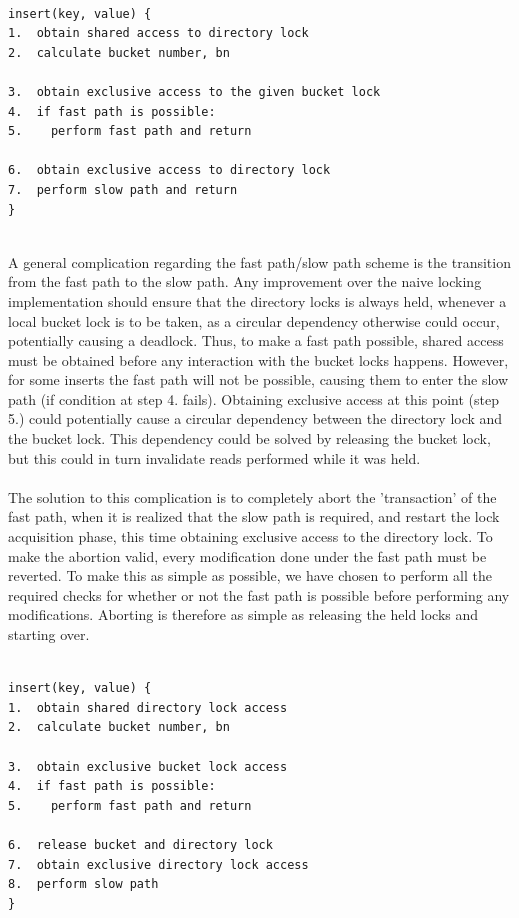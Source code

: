 \documentclass[11pt]{report} %
\begin{document}
\\
\begin{fminipage}{\linewidth}
\begin{lstlisting}[]
insert(key, value) {
1.  obtain shared access to directory lock
2.  calculate bucket number, bn

3.  obtain exclusive access to the given bucket lock 
4.  if fast path is possible:
5.    perform fast path and return
 
6.  obtain exclusive access to directory lock
7.  perform slow path and return
}
\end{lstlisting}
\end{fminipage}
\vphantom{fill}\\
A general complication regarding the fast path/slow path scheme is the transition from the fast path to the slow path. Any improvement over the naive locking implementation should ensure that the directory locks is always held, whenever a local bucket lock is to be taken, as a circular dependency otherwise could occur, potentially causing a deadlock. Thus, to make a fast path possible, shared access must be obtained before any interaction with the bucket locks happens. However, for some inserts the fast path will not be possible, causing them to enter the slow path (if condition at step 4. fails). Obtaining exclusive access at this point (step 5.) could potentially cause a circular dependency between the directory lock and the bucket lock. This dependency could be solved by releasing the bucket lock, but this could in turn invalidate reads performed while it was held.\\
\\
The solution to this complication is to completely abort the 'transaction' of the fast path, when it is realized that the slow path is required, and restart the lock acquisition phase, this time obtaining exclusive access to the directory lock. To make the abortion valid, every modification done under the fast path must be reverted. To make this as simple as possible, we have chosen to perform all the required checks for whether or not the fast path is possible before performing any modifications. Aborting is therefore as simple as releasing the held locks and starting over.\\
\\
\noindent
\begin{fminipage}{\linewidth}
\begin{lstlisting}[]
insert(key, value) {
1.  obtain shared directory lock access
2.  calculate bucket number, bn

3.  obtain exclusive bucket lock access
4.  if fast path is possible:
5.    perform fast path and return

6.  release bucket and directory lock
7.  obtain exclusive directory lock access
8.  perform slow path
}
\end{lstlisting}
\end{fminipage}
\end{document}
